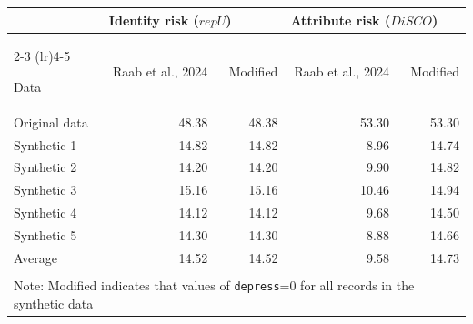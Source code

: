\begin{tabular}{lrrrr}
   
\toprule & 
\multicolumn{2}{l}{Identity risk ($repU$)} &
\multicolumn{2}{l}{Attribute risk ($DiSCO$)}
\\  
 
\cmidrule(lr){2-3}
\cmidrule(lr){4-5}
 
Data & Raab et al., 2024 & Modified & Raab et al., 2024 & Modified
\\ 

\midrule
Original data & 48.38 & 48.38 & 53.30 & 53.30 \\ 
   \midrule
Synthetic 1 & 14.82 & 14.82 & 8.96 & 14.74 \\ 
  Synthetic 2 & 14.20 & 14.20 & 9.90 & 14.82 \\ 
  Synthetic 3 & 15.16 & 15.16 & 10.46 & 14.94 \\ 
  Synthetic 4 & 14.12 & 14.12 & 9.68 & 14.50 \\ 
  Synthetic 5 & 14.30 & 14.30 & 8.88 & 14.66 \\ 
   \midrule
Average & 14.52 & 14.52 & 9.58 & 14.73 \\ 
   \bottomrule \\[-1.8ex] \multicolumn{5}{p{4in}}{Note: Modified indicates that values of \texttt{depress}=0 for all records in the synthetic data} 
\end{tabular}
